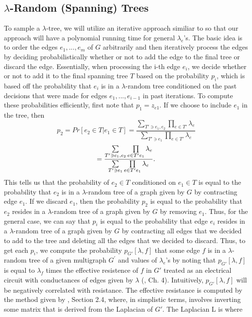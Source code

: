 \documentclass[oneside]{projectpaper} %
\begin{document}
\subsection{$\lambda$-Random (Spanning) Trees}
To sample a $\lambda$-tree, we will utilize an iterative approach similiar to \cite{VGK90} so that our approach will have a polynomial running time for general $\lambda_e$'s. The basic idea is to order the edges $e_1,...,e_m$ of $G$ arbitrarily and then iteratively process the edges by deciding probabilistically whether or not to add the edge to the final tree or discard the edge. Essentially, when processing the i-th edge $e_i$, we decide whether or not to add it to the final spanning tree $T$ based on the probability $p_i$, which is based off the probability that $e_i$ is in a $\lambda$-random tree conditioned on the past decisions that were made for edges $e_1,...,e_{i-1}$ in past iterations. To compute these probabilities efficiently, first note that $p_1 = z_{e1}$. If we choose to include $e_1$ in the tree, then
\begin{equation*}
p_2 = Pr[e_2 \in T | e_1 \in T] = \frac{\sum\limits_{T' \ni e_1, e_2}\prod\limits_{e \in T'}\lambda_e}{\sum\limits_{T' \ni e_1}\prod\limits_{e \in T'}\lambda_e}
\end{equation*}
\begin{equation*}
= \frac{\sum\limits_{T' \ni e_1, e_2}\prod\limits_{e \in T'\\e_1}\lambda_e}{\sum\limits_{T' \ni e_1}\prod\limits_{e \in T'\\e_1}\lambda_e}.
\end{equation*}
This tells us that the probability of $e_2 \in T$ conditioned on $e_1 \in T$ is equal to the probability that $e_2$ is in a $\lambda$-random tree of a graph given by $G$ by contracting edge $e_1$. If we discard $e_1$, then the probability $p_2$ is equal to the probability that $e_2$ resides in a $\lambda$-random tree of a graph given by $G$ by removing $e_1$. Thus, for the general case, we can say that $p_i$ is equal to the probability that edge $e_i$ resides in a $\lambda$-random tree of a graph given by $G$ by contracting all edges that we decided to add to the tree and deleting all the edges that we decided to discard. Thus, to get each $p_i$, we compute the probability $p_{G'}[\lambda,f]$ that some edge $f$ is in a $\lambda$-random tree of a given multigraph $G^{'}$ and values of $\lambda_e$'s by noting that $p_{G'}[\lambda,f]$ is equal to $\lambda_f$ times the effective resistence of $f$ in $G'$ treated as an electrical circuit with conductances of edges given by $\lambda$ (\cite{LP14}, Ch. 4). Intuitively, $p_{G'}[\lambda,f]$ will be negatively correlated with resistance. The effective resistance is computed by the method given by \cite{GBS08}, Section 2.4, where, in simplistic terms, involves inverting some matrix that is derived from the Laplacian of $G'$. The Laplacian L is where
\end{document}
